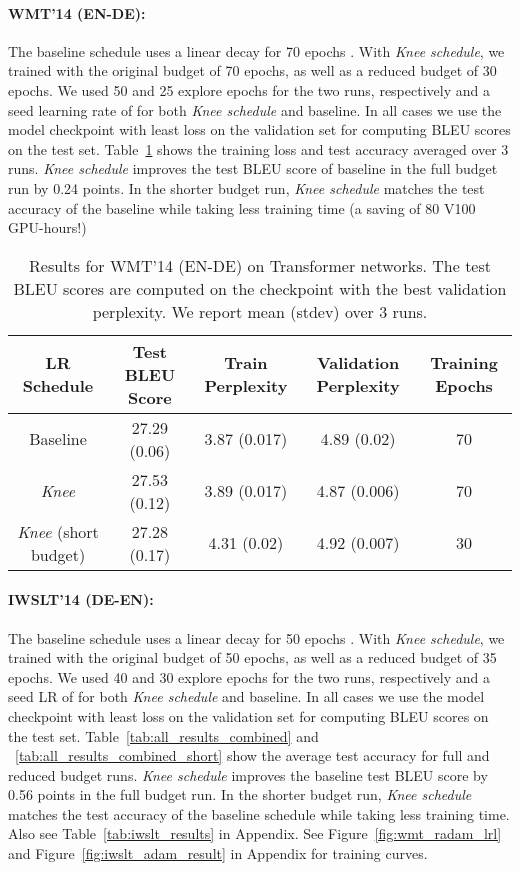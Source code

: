 \documentclass{article} \usepackage{iclr2021_conference,times}
\newcommand{\lrschedule}{\textit{Knee schedule}}
\newcommand{\lrscheduleshort}{\textit{Knee}}
\begin{document}
\paragraph{WMT'14 (EN-DE):} The baseline schedule uses a linear decay for 70 epochs \citep{liu2019variance_radam}. With \lrschedule{}, we trained with the original budget of 70 epochs, as well as a reduced budget of 30 epochs. We used 50 and 25 explore epochs for the two runs, respectively and a seed learning rate of  for both \lrschedule{} and baseline. In all cases we use the model checkpoint with least loss on the validation set for computing BLEU scores on the test set. Table~\ref{tab:wmt_results} shows the training loss and test accuracy averaged over 3 runs. \lrschedule{} improves the test BLEU score of baseline in the full budget run by 0.24 points. In the shorter budget run, \lrschedule{} matches the test accuracy of the baseline while taking  less training time (a saving of 80 V100 GPU-hours!)

\vspace{-4pt}
\begin{table}[h]
\captionsetup{type=table} \small
\centering
\caption{Results for WMT'14 (EN-DE) on Transformer networks. The test BLEU scores are computed on the checkpoint with the best validation perplexity. We report mean (stdev) over 3 runs.}
\label{tab:wmt_results}
\begin{tabular}{ccccc}
\toprule
  \multirow{1}{*}{LR Schedule} & Test BLEU Score & Train Perplexity & Validation Perplexity & Training Epochs \\
 \midrule
  Baseline   &  27.29 (0.06) & 3.87 (0.017) & 4.89 (0.02) & 70 \\
  \lrscheduleshort{}  & 27.53 (0.12) & 3.89 (0.017) & 4.87 (0.006) & 70 \\ 
  \lrscheduleshort{} (short budget) & 27.28 (0.17) & 4.31 (0.02) & 4.92 (0.007)  & 30\\
\bottomrule
\end{tabular}
\vspace{-6pt}
\end{table}

\paragraph{IWSLT'14 (DE-EN):} The baseline schedule uses a linear decay for 50 epochs \citep{liu2019variance_radam}. With \lrschedule{}, we trained with the original budget of 50 epochs, as well as a reduced budget of 35 epochs. We used 40 and 30 explore epochs for the two runs, respectively and a seed LR of  for both \lrschedule{} and baseline. In all cases we use the model checkpoint with least loss on the validation set for computing BLEU scores on the test set. Table~\ref{tab:all_results_combined} and ~\ref{tab:all_results_combined_short} show the average test accuracy for full and reduced budget runs. \lrschedule{} improves the baseline test BLEU score by 0.56 points in the full budget run. In the shorter budget run, \lrschedule{} matches the test accuracy of the baseline schedule while taking  less training time. Also see Table~\ref{tab:iwslt_results} in Appendix. See Figure~\ref{fig:wmt_radam_lrl} and Figure~\ref{fig:iwslt_adam_result} in Appendix for training curves.
\end{document}
